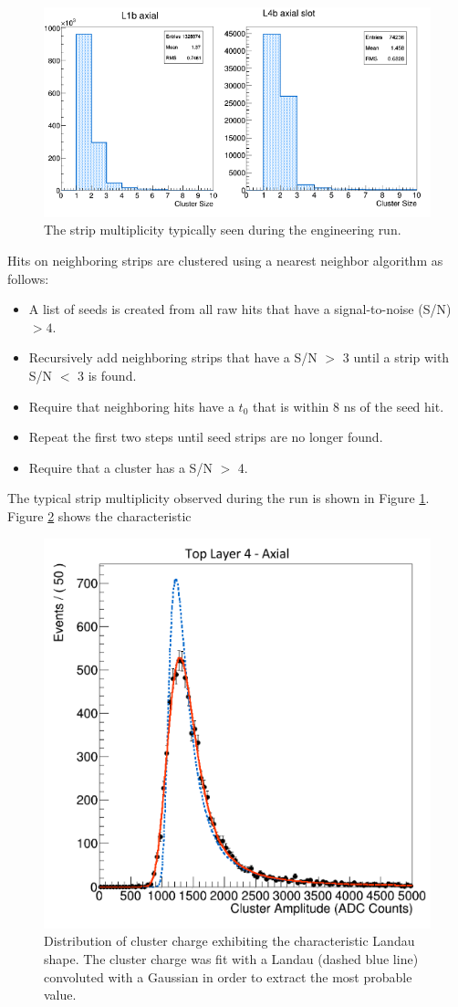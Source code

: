\begin{figure}[h!t]
    \centering
    \includegraphics[width=\textwidth]{images/cluster_size.png}
    \caption{The strip multiplicity typically seen during the engineering run.}
    \label{fig:strip_mult}
\end{figure}  
Hits on neighboring strips are clustered using a nearest neighbor
algorithm as follows: 
\begin{itemize}
    \item A list of seeds is created from all raw hits that have a signal-to-noise (S/N)
          $>4$.
    \item Recursively add neighboring strips that have a S/N $>$ 3 until a strip with
          S/N $<$ 3 is found.
      \item Require that neighboring hits have a $t_{0}$ that is within 8 ns of the seed hit.
    \item Repeat the first two steps until seed strips are no longer found.
    \item Require that a cluster has a S/N $>$ 4.
\end{itemize}
The typical strip multiplicity observed during the run is shown in Figure 
\ref{fig:strip_mult}. Figure \ref{fig:cluster_charge} shows the characteristic
\begin{figure}[h!t]
    \centering
    \includegraphics[width=.7\textwidth]{images/top_layer4_axial_cluster_charge.png}
    \caption{Distribution of cluster charge exhibiting the characteristic Landau
    shape.  The cluster charge was fit with a Landau (dashed blue line) convoluted
    with a Gaussian in order to extract the most probable value.}
    \label{fig:cluster_charge}
\end{figure}  
